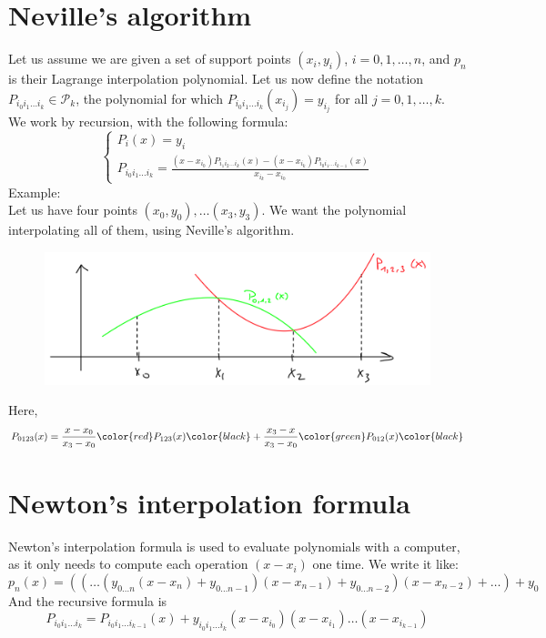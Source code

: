 \documentclass[12pt, openany]{report}
\theoremstyle{definition}
\begin{document}
\section{Neville's algorithm}
Let us assume we are given a set of support points \((x_i,y_i)\), \(i=0,1,\dots,n\), and \(p_n\) is their Lagrange interpolation polynomial. Let us now define the notation \(P_{i_0i_1\dots i_k}\in \mathcal{P}_k\), the polynomial for which \(P_{i_0i_1\dots i_k}(x_{i_j})=y_{i_j}\)  for all \(j=0,1,\dots,k\). We work by recursion, with the following formula:
\begin{equation}
    \begin{cases}
        P_i(x) = y_i\\
        P_{i_0i_1\dots i_k} = \frac{(x-x_{i_0})P_{i_1i_2\dots i_k}(x) - (x-x_{i_k})P_{i_0i_1\dots i_{k-1}}(x)}{x_{i_k}-x_{i_0}}
    \end{cases}
\end{equation}
Example:\\
Let us have four points \((x_0,y_0),\dots(x_3,y_3)\). We want the polynomial interpolating all of them, using Neville's algorithm. 
\begin{figure}[H]
    \centering
    \includegraphics[width=0.5\linewidth]{img/neville.png}
\end{figure}
Here, 
\begin{equation}
    P_{0123}(x) = \frac{x-x_0}{x_3-x_0}\color{red}P_{123}(x)\color{black}+\frac{x_3-x}{x_3-x_0}\color{green}P_{012}(x)\color{black}
\end{equation}
\section{Newton's interpolation formula}
Newton's interpolation formula is used to evaluate polynomials with a computer, as it only needs to compute each operation \((x-x_i)\) one time. We write it like:
\begin{equation}
    p_n(x) = \left(\left(\dots\left(y_{0\dots n}(x-x_n)+y_{0\dots n-1}\right)(x-x_{n-1})+y_{0\dots n-2}\right)(x-x_{n-2})+\dots\right) + y_0
\end{equation}
And the recursive formula is
\begin{equation}
    P_{i_0i_1\dots i_k}= P_{i_0i_1\dots i_{k-1}}(x) + y_{i_0i_1\dots i_k}(x-x_{i_0})(x-x_{i_1})\dots(x-x_{i_{k-1}})
\end{equation}
\end{document}
